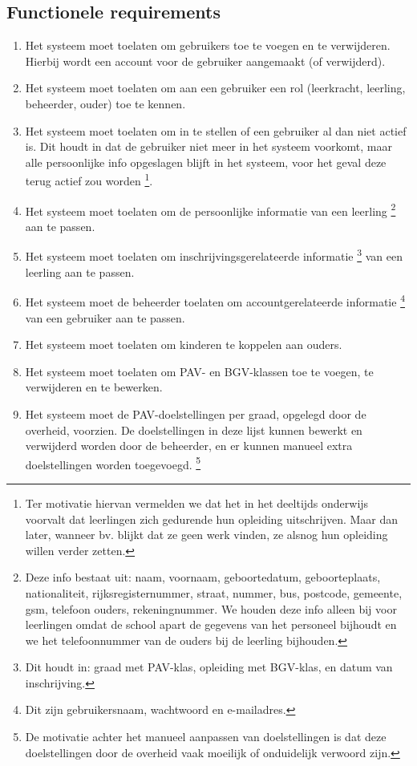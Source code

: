 \documentclass[a4paper]{article}
\begin{document}
\subsection{Functionele requirements}
\begin{enumerate}[label=F\arabic*]
\item Het systeem moet toelaten om gebruikers toe te voegen en te verwijderen. Hierbij wordt een account voor de gebruiker aangemaakt (of verwijderd).
\item Het systeem moet toelaten om aan een gebruiker een rol (leerkracht, leerling, beheerder, ouder) toe te kennen.
\item Het systeem moet toelaten om in te stellen of een gebruiker al dan niet actief is. Dit houdt in dat de gebruiker niet meer in het systeem voorkomt, maar alle persoonlijke info opgeslagen blijft in het systeem, voor het geval deze terug actief zou worden \footnote{Ter motivatie hiervan vermelden we dat het in het deeltijds onderwijs voorvalt dat leerlingen zich gedurende hun opleiding uitschrijven. Maar dan later, wanneer bv. blijkt dat ze geen werk vinden, ze alsnog hun opleiding willen verder zetten.}.
\item \label{itm:pers_info} Het systeem moet toelaten om de persoonlijke informatie van een leerling \footnote{Deze info bestaat uit: naam, voornaam, geboortedatum, geboorteplaats, nationaliteit, rijksregisternummer, straat, nummer, bus, postcode, gemeente, gsm, telefoon ouders, rekeningnummer. We houden deze info alleen bij voor leerlingen omdat de school apart de gegevens van het personeel bijhoudt en we het telefoonnummer van de ouders bij de leerling bijhouden.} aan te passen. 
\item \label{itm:inschr_info} Het systeem moet toelaten om inschrijvingsgerelateerde informatie \footnote{Dit houdt in: graad met PAV-klas, opleiding met BGV-klas, en datum van inschrijving.} van een leerling aan te passen.
\item \label{itm:account_info} Het systeem moet de beheerder toelaten om accountgerelateerde informatie \footnote{Dit zijn gebruikersnaam, wachtwoord en e-mailadres.} van een gebruiker aan te passen.
\item Het systeem moet toelaten om kinderen te koppelen aan ouders.
\item Het systeem moet toelaten om PAV- en BGV-klassen toe te voegen, te verwijderen en te bewerken.  
\item Het systeem moet de PAV-doelstellingen per graad, opgelegd door de overheid, voorzien. De doelstellingen in deze lijst kunnen bewerkt en verwijderd worden door de beheerder, en er kunnen manueel extra doelstellingen worden toegevoegd. \footnote{De motivatie achter het manueel aanpassen van doelstellingen is dat deze doelstellingen door de overheid vaak moeilijk of onduidelijk verwoord zijn.}

\end{enumerate}
\end{document}
